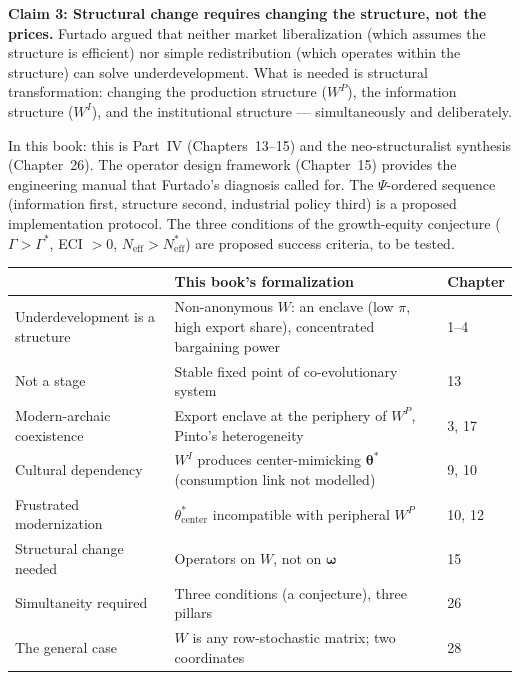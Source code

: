 \documentclass[../structural_economics_book.tex]{subfiles}
\begin{document}
\textbf{Claim 3: Structural change requires changing the structure, not the prices.} Furtado argued that neither market liberalization (which assumes the structure is efficient) nor simple redistribution (which operates within the structure) can solve underdevelopment. What is needed is structural transformation: changing the production structure ($W^P$), the information structure ($W^I$), and the institutional structure --- simultaneously and deliberately.

In this book: this is Part~IV (Chapters~13--15) and the neo-structuralist synthesis (Chapter~26). The operator design framework (Chapter~15) provides the engineering manual that Furtado's diagnosis called for. The $\Psi$-ordered sequence (information first, structure second, industrial policy third) is a proposed implementation protocol. The three conditions of the growth-equity conjecture ($\Gamma > \Gamma^*$, ECI $> 0$, $N_{\text{eff}} > N^*_{\text{eff}}$) are proposed success criteria, to be tested.

\begin{center}
\begin{tabularx}{\textwidth}{LLL}
\toprule
\textbf{\citet{furtado1961desenvolvimento,furtado1974mito}} & \textbf{This book's formalization} & \textbf{Chapter} \\
\midrule
Underdevelopment is a structure & Non-anonymous $W$: an enclave (low $\pi$, high export share), concentrated bargaining power & 1--4 \\
Not a stage & Stable fixed point of co-evolutionary system & 13 \\
Modern-archaic coexistence & Export enclave at the periphery of $W^P$, Pinto's heterogeneity & 3, 17 \\
Cultural dependency & $W^I$ produces center-mimicking $\boldsymbol{\theta}^*$ (consumption link not modelled) & 9, 10 \\
Frustrated modernization & $\theta^*_{\text{center}}$ incompatible with peripheral $W^P$ & 10, 12 \\
Structural change needed & Operators on $W$, not on $\boldsymbol{\omega}$ & 15 \\
Simultaneity required & Three conditions (a conjecture), three pillars & 26 \\
The general case & $W$ is any row-stochastic matrix; two coordinates & 28 \\
\bottomrule
\end{tabularx}
\end{center}
\end{document}
